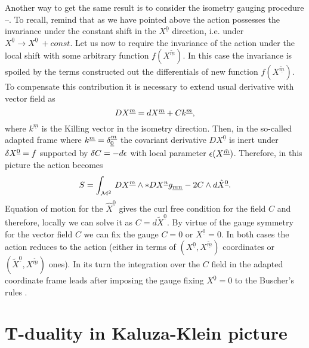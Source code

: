 \documentclass[a4paper,11pt]{article}
\begin{document}
Another way to get the same result is to consider the isometry
gauging procedure \cite{hs0}--\cite{ps}. To recall, remind that as we have 
pointed above
the action  possesses the invariance under the constant
shift in the $X^{\underline{0}}$ direction, i.e. under
$X^{\underline{0}} \rightarrow X^{\underline{0}}~+const$. Let us
now to require the invariance of the action under the local shift
with some arbitrary function $f(X^{\underline{\tilde m}})$. In
this case the invariance is spoiled by the terms constructed out
the differentials of new function $f(X^{\underline{\tilde m}})$.
To compensate this contribution it is necessary to extend usual
derivative with vector field as
\begin{equation}\plabel{DX}
DX^{\underline m}=dX^{\underline m}+Ck^{\underline m},
\end{equation}
where $k^{\underline m}$ is the Killing vector in the isometry
direction. Then, in the so-called adapted frame where
$k^{\underline m}=\delta^{\underline m}_{\underline 0}$ the covariant
derivative $DX^{\underline 0}$ is inert under $\delta X^{\underline
0}=f$ supported by $\delta C=-d \epsilon$ with local parameter 
$\epsilon(X^{\underline{\tilde m}})$.
Therefore, in this picture the action  becomes
\begin{equation}\plabel{SD}
S=\int_{{\cal M}^2}\, DX^{\underline m}\wedge \ast DX^{\underline
n}g_{\underline {mn}}-2C\wedge d\hat{X}^{\underline 0}.
\end{equation}
Equation of motion for the $\hat{X}^{\underline 0}$ gives the curl
free condition for the field $C$ and therefore, locally we can
solve it as $C=d\tilde{X}^{\underline 0}$. By virtue of the gauge
symmetry for the vector field $C$ we can fix the gauge $C=0$ or
${X}^{\underline 0}=0$. In both cases the action  reduces to
the action  (either in terms of $(X^{\underline 0},
X^{\underline{\tilde m}})$ coordinates or $(\tilde{X}^{\underline
0}, X^{\underline{\tilde m}})$ ones). In its turn the integration
over the $C$ field in the adapted coordinate frame leads after
imposing the gauge fixing ${X}^{\underline 0}=0$ to the Buscher's
rules .



\section{T-duality in Kaluza-Klein picture}
\end{document}
